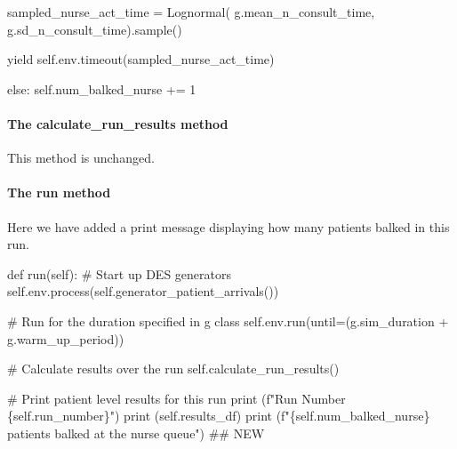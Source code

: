 \documentclass[
  letterpaper,
  DIV=11,
  numbers=noendperiod]{scrreprt}
\let\oldparagraph\paragraph
\renewcommand{\paragraph}[1]{\oldparagraph{#1}\mbox{}}
\newenvironment{Shaded}{\begin{snugshade}}{\end{snugshade}}
\newcommand{\BuiltInTok}[1]{\textcolor[rgb]{0.00,0.23,0.31}{#1}}
\newcommand{\CommentTok}[1]{\textcolor[rgb]{0.37,0.37,0.37}{#1}}
\newcommand{\ControlFlowTok}[1]{\textcolor[rgb]{0.00,0.23,0.31}{#1}}
\newcommand{\DecValTok}[1]{\textcolor[rgb]{0.68,0.00,0.00}{#1}}
\newcommand{\KeywordTok}[1]{\textcolor[rgb]{0.00,0.23,0.31}{#1}}
\newcommand{\NormalTok}[1]{\textcolor[rgb]{0.00,0.23,0.31}{#1}}
\newcommand{\OperatorTok}[1]{\textcolor[rgb]{0.37,0.37,0.37}{#1}}
\newcommand{\SpecialCharTok}[1]{\textcolor[rgb]{0.37,0.37,0.37}{#1}}
\newcommand{\SpecialStringTok}[1]{\textcolor[rgb]{0.13,0.47,0.30}{#1}}
\newcommand{\VariableTok}[1]{\textcolor[rgb]{0.07,0.07,0.07}{#1}}
\begin{document}
\begin{Shaded}
\begin{Highlighting}[]
\NormalTok{                sampled\_nurse\_act\_time }\OperatorTok{=}\NormalTok{ Lognormal(}
\NormalTok{                    g.mean\_n\_consult\_time, g.sd\_n\_consult\_time).sample()}

                \ControlFlowTok{yield} \VariableTok{self}\NormalTok{.env.timeout(sampled\_nurse\_act\_time)}

        \ControlFlowTok{else}\NormalTok{:}
            \VariableTok{self}\NormalTok{.num\_balked\_nurse }\OperatorTok{+=} \DecValTok{1}
\end{Highlighting}
\end{Shaded}

\paragraph{The calculate\_run\_results
method}\label{the-calculate_run_results-method-2}

This method is unchanged.

\paragraph{The run method}\label{the-run-method-4}

Here we have added a print message displaying how many patients balked
in this run.

\begin{Shaded}
\begin{Highlighting}[]
\KeywordTok{def}\NormalTok{ run(}\VariableTok{self}\NormalTok{):}
    \CommentTok{\# Start up DES generators}
    \VariableTok{self}\NormalTok{.env.process(}\VariableTok{self}\NormalTok{.generator\_patient\_arrivals())}

    \CommentTok{\# Run for the duration specified in g class}
    \VariableTok{self}\NormalTok{.env.run(until}\OperatorTok{=}\NormalTok{(g.sim\_duration }\OperatorTok{+}\NormalTok{ g.warm\_up\_period))}

    \CommentTok{\# Calculate results over the run}
    \VariableTok{self}\NormalTok{.calculate\_run\_results()}

    \CommentTok{\# Print patient level results for this run}
    \BuiltInTok{print}\NormalTok{ (}\SpecialStringTok{f"Run Number }\SpecialCharTok{\{}\VariableTok{self}\SpecialCharTok{.}\NormalTok{run\_number}\SpecialCharTok{\}}\SpecialStringTok{"}\NormalTok{)}
    \BuiltInTok{print}\NormalTok{ (}\VariableTok{self}\NormalTok{.results\_df)}
    \BuiltInTok{print}\NormalTok{ (}\SpecialStringTok{f"}\SpecialCharTok{\{}\VariableTok{self}\SpecialCharTok{.}\NormalTok{num\_balked\_nurse}\SpecialCharTok{\}}\SpecialStringTok{ patients balked at the nurse queue"}\NormalTok{) }\CommentTok{\#\# NEW}
\end{Highlighting}
\end{Shaded}
\end{document}
